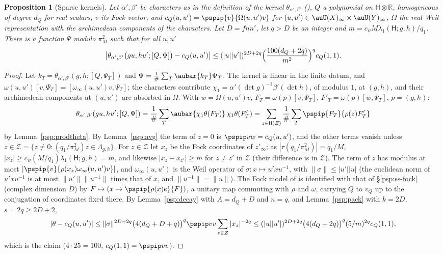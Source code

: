 \documentclass[10pt]{amsart}
\newtheorem{proposition}[theorem]{Proposition}
\theoremstyle{definition}
\theoremstyle{remark}
\newcommand{\R}{\mathbb R}
\begin{document}
\begin{proposition}[Sparse kernels]\label{psp:sparse}
Let $\alpha',\beta'$ be characters as in the definition of the kernel $\theta_{\alpha',\beta'}$
({\cite[\S2.3]{P53}}), $Q$ a polynomial on $\mathsf H\otimes\R$, homogeneous of degree $d_Q$ for real
scalars, $v$ its Fock vector, and $c_Q(u,u')=\pspip{v}{\Omega(u,u')v}$ for $(u,u')\in\auU(X)_\infty
\times\auU(Y)_\infty$, $\Omega$ the real Weil representation with the archimedean components of the
characters. Let $D=fnn'$, let $q>D$ be an integer and $m=c_\psi M\lambda_1(\mathsf H;g,h)/q_1$. There
is a function $\Psi$ modulo $\pi_M^2$ such that for all $u,u'$
\[
\bigl|\theta_{\alpha',\beta'}\bigl(gu,hu';[Q,\Psi]\bigr)-c_Q(u,u')\bigr|\le(|u||u'|)^{2D+2q}
\Bigl(\frac{100(d_Q+2q)}{m^2}\Bigr)^q c_Q(1,1).
\]
\end{proposition}
\begin{proof}
Let $k_T=\theta_{\alpha',\beta'}(g,h;[Q,\Psi_T])$ and $\Psi=\frac1\#\sum_T\aubar{k_T}\Psi_T$. The kernel is
linear in the finite datum, and $\omega(u,u')[v,\Psi_T]=[\omega_\infty(u,u')v,\Psi_T]$; the characters
contribute $\chi_1=\alpha'(\det g)^{-1}\beta'(\det h)$, of modulus $1$, at $(g,h)$, and their
archimedean components at $(u,u')$ are absorbed in $\Omega$. With $w=\Omega(u,u')v$,
$F_T=\omega(p)[v,\Psi_T]$, $F'_T=\omega(p)[w,\Psi_T]$, $p=(g,h)$:
\[
\theta_{\alpha',\beta'}(gu,hu';[Q,\Psi])=\frac1\#\sum_T\aubar{\chi_1\theta(F_T)}\,\chi_1\theta(F'_T)
=\sum_{z\in\mathsf H(E)}\frac1\#\sum_T\pspip{F_T}{\rho(z)F'_T}
\]
by Lemma~\ref{psp:prodtheta}. By Lemma~\ref{psp:avg} the term of $z=0$ is $\pspip vw=c_Q(u,u')$, and
the other terms vanish unless $z\in\mathcal Z=\{z\ne0:(q_1/\pi_M^2)z\in\Lambda_{g,h}\}$. For
$z\in\mathcal Z$ let $x_z$ be the Fock coordinates of $z'_\infty$; as $|\tau(q_1/\pi_M^2)|=q_1/M$,
$|x_z|\ge c_\psi(M/q_1)\lambda_1(\mathsf H;g,h)=m$, and likewise $|x_z-x_{z'}|\ge m$ for $z\ne z'$ in
$\mathcal Z$ (their difference is in $\mathcal Z$). The term of $z$ has modulus at most
$|\pspip{v}{\rho(x_z)\omega_\infty(u,u')v}|$, and $\omega_\infty(u,u')$ is the Weil operator of
$\sigma\colon x\mapsto u'xu^{-1}$, with $\|\sigma\|\le|u'||u|$ (the euclidean norm of $u'xu^{-1}$ is at
most $\|u'\|\|u^{-1}\|$ times that of $x$, and $\|u^{-1}\|=\|u\|$). The Fock model of
{\cite[\S5.2.1]{P49}} is identified with that of \S\ref{psp:ss-fock} (complex dimension $D$) by
$F\mapsto(x\mapsto\pspip{\rho(x)e}{F})$, a unitary map commuting with $\rho$ and $\omega$, carrying
$Q$ to $v_Q$ up to the conjugation of coordinates fixed there. By Lemma~\ref{psp:decay} with
$A=d_Q+D$ and $n=q$, and Lemma~\ref{psp:pack} with $k=2D$, $s=2q\ge2D+2$,
\[
|\theta-c_Q(u,u')|\le\|\sigma\|^{2D+2q}\bigl(4(d_Q+D+q)\bigr)^q\pspip vv\sum_{z\in\mathcal Z}|x_z|^{-2q}
\le(|u||u'|)^{2D+2q}\bigl(4(d_Q+2q)\bigr)^q(5/m)^{2q}c_Q(1,1),
\]
which is the claim ($4\cdot25=100$, $c_Q(1,1)=\pspip vv$).
\end{proof}
\end{document}

